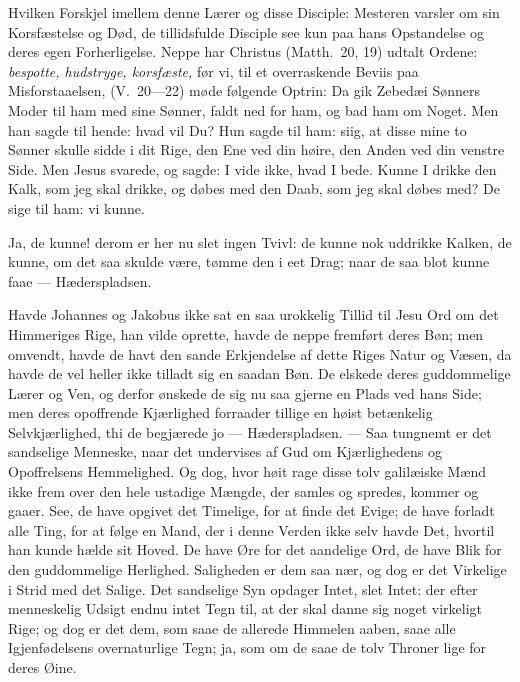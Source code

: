 \documentclass[12pt,a4paper]{book}
\begin{document}
Hvilken Forskjel imellem denne Lærer og disse Disciple: Mesteren varsler om sin
Korsfæstelse og Død, de tillidsfulde Disciple see kun paa hans Opstandelse og
deres egen Forherligelse. Neppe har Christus (Matth.\ 20, 19) udtalt Ordene:
\emph{bespotte, hudstryge, korsfæste,} før vi, til et overraskende Beviis paa
Misforstaaelsen, (V.\ 20---22) møde følgende Optrin: {\large Da gik Zebedæi
Sønners Moder til ham med sine Sønner, faldt
ned for ham, og bad ham om Noget. Men han sagde til hende: hvad vil Du? Hun
sagde til ham: siig, at disse mine to Sønner skulle sidde i dit Rige, den Ene ved
din høire, den Anden ved din venstre Side. Men Jesus svarede, og sagde: I vide
ikke, hvad I bede. Kunne I drikke den Kalk, som jeg skal drikke, og døbes med den
Daab, som jeg skal døbes med? De sige til ham: vi kunne.}

Ja, de kunne! derom er her nu slet ingen Tvivl: de kunne nok uddrikke Kalken, de
kunne, om det saa skulde være, tømme den i eet Drag; naar de saa blot kunne faae
--- Hæderspladsen.

Havde Johannes og Jakobus ikke sat en saa urokkelig Tillid til Jesu Ord om det
Himmeriges Rige, han vilde oprette, havde de neppe fremført deres Bøn; men
omvendt, havde de havt den sande Erkjendelse af dette Riges Natur og Væsen, da
havde de vel heller ikke tilladt sig en saadan Bøn. De elskede deres
guddommelige Lærer og Ven, og derfor ønskede de sig nu saa gjerne en Plads ved
hans Side; men deres opoffrende Kjærlighed forraader tillige en høist betænkelig
Selvkjærlighed, thi de begjærede jo --- Hæderspladsen. --- Saa tungnemt er det
sandselige Menneske, naar det undervises af Gud om Kjærlighedens og Opoffrelsens
Hemmelighed. Og dog, hvor høit rage disse tolv galilæiske Mænd ikke frem over den
hele ustadige Mængde, der samles og spredes, kommer og gaaer. See, de have
opgivet det Timelige, for at finde det Evige; de have forladt alle Ting, for at
følge en Mand, der i denne Verden ikke selv havde Det, hvortil han kunde hælde
sit Hoved. De have Øre for det aandelige Ord, de have Blik for den guddommelige
Herlighed. Saligheden er dem saa nær, og dog er det Virkelige i Strid med det
Salige. Det sandselige Syn opdager Intet, slet Intet: der efter menneskelig
Udsigt
endnu intet Tegn til, at der skal danne sig noget virkeligt Rige; og dog er det dem, som
saae de allerede Himmelen aaben, saae alle Igjenfødelsens overnaturlige Tegn; ja, som om
de saae de tolv Throner lige for deres Øine.
\end{document}
